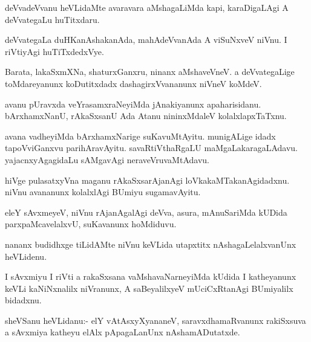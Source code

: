 \documentclass{article}
\begin{document}
\begin{mn}%
deVvadeVvanu heVLidaMte avaravara aMshagaLiMda kapi, karaDigaLAgi A deVvategaLu huTitxdaru.
\end{mn}

\begin{mn}%
deVvategaLa duHKanAshakanAda, mahAdeVvanAda A viSuNxveV niVnu. I riVtiyAgi huTiTxdedxVye.
\end{mn}

\begin{mn}%
Barata, lakaSxmXNa, shaturxGanxru, ninanx aMshaveVneV. a deVvategaLige toMdareyanunx 
koDutitxdadx dashagirxVvananunx niVneV koMdeV. 
\end{mn}

\begin{mn}%
avanu pUravxda veYrasamxraNeyiMda jAnakiyanunx apaharisidanu. bArxhamxNanU, rAkaSxsanU Ada 
Atanu nininxMdaleV kolalxlapxTaTxnu. 
\end{mn}

\begin{mn}%
avana vadheyiMda bArxhamxNarige suKavuMtAyitu. munigALige idadx tapoVviGanxvu 
parihAravAyitu. savaRtiVthaRgaLU maMgaLakaragaLAdavu. yajacnxyAgagidaLu sAMgavAgi 
neraveVruvaMtAdavu.
\end{mn}

\begin{mn}%
hiVge pulasatxyVna maganu rAkaSxsarAjanAgi loVkakaMTakanAgidadxnu. niVnu avananunx 
kolalxlAgi BUmiyu sugamavAyitu. 
\end{mn}

\begin{mn}%
eleY sAvxmeyeV, niVnu rAjanAgalAgi deVva, asura, mAnuSariMda kUDida parxpaMcavelalxvU, 
suKavanunx hoMdiduvu.
\end{mn}

\begin{mn}%
nananx budidhxge tiLidAMte niVnu keVLida utapxtitx nAshagaLelalxvanUnx heVLidenu.
\end{mn}

\begin{mn}%
I sAvxmiyu I riVti a rakaSxsana vaMshavaNarneyiMda kUdida I katheyanunx keVLi kaNiNxnalilx 
niVranunx, A saBeyalilxyeV mUciCxRtanAgi BUmiyalilx bidadxnu.
\end{mn}



\begin{mn}%
sheVSanu heVLidanu:- elY vAtAsxyXyananeV, saravxdhamaRvanunx rakiSxsuva a sAvxmiya katheyu 
elAlx pApagaLanUnx nAshamADutatxde.
\end{mn}
\end{document}

